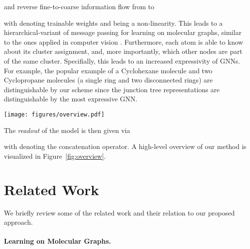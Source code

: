 \documentclass{article}
\begin{document}
and reverse fine-to-coarse information flow from  to 

with  denoting trainable weights and  being a non-linearity.
This leads to a hierarchical-variant of message passing for learning on molecular graphs, similar to the ones applied in computer vision \citep{Ronneberger/etal/2015,Newell/etal/2016,Lin/etal/2017}.
Furthermore, each atom is able to know about its cluster assignment, and, more importantly, which other nodes are part of the same cluster.
Specifially, this leads to an increased expressivity of GNNs.
For example, the popular example of a Cyclohexane molecule and two Cyclopropane molecules (a single ring and two disconnected rings) \citep{Klicpera/etal/2020} are distinguishable by our scheme since the junction tree representations are distinguishable by the most expressive GNN\@.

\begin{figure*}[t]
  \centering
  \texttt{[image: figures/overview.pdf]}
  \caption{Overview of the proposed approach.
    Two GNNs are operating on the distinct graph representations  and , and receive coarse-to-fine and fine-to-coarse information before another round of message passing starts.
    }\label{fig:overview}
\end{figure*}
The \emph{readout} of the model is then given via

with  denoting the concatenation operator.
A high-level overview of our method is visualized in Figure~\ref{fig:overview}.

\section{Related Work}\label{sec:related_work}

We briefly review some of the related work and their relation to our proposed approach.

\paragraph{Learning on Molecular Graphs.}\label{par:learning_on_molecular_graphs.}
\end{document}
